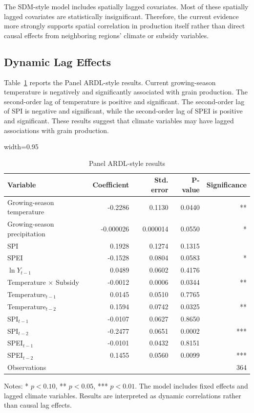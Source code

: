 \documentclass[12pt,a4paper]{article}
\begin{document}
The SDM-style model includes spatially lagged covariates. Most of these spatially lagged covariates are statistically insignificant. Therefore, the current evidence more strongly supports spatial correlation in production itself rather than direct causal effects from neighboring regions' climate or subsidy variables.

\subsection{Dynamic Lag Effects}

Table~\ref{tab:ardl} reports the Panel ARDL-style results. Current growing-season temperature is negatively and significantly associated with grain production. The second-order lag of temperature is positive and significant. The second-order lag of SPI is negative and significant, while the second-order lag of SPEI is positive and significant. These results suggest that climate variables may have lagged associations with grain production.

\begin{table}[H]
\centering
\caption{Panel ARDL-style results}
\label{tab:ardl}
\begin{threeparttable}
\begin{adjustbox}{width=0.95\textwidth}
\begin{tabular}{lrrrr}
\toprule
Variable & Coefficient & Std. error & P-value & Significance \\
\midrule
Growing-season temperature & -0.2286 & 0.1130 & 0.0440 & ** \\
Growing-season precipitation & -0.000026 & 0.000014 & 0.0550 & * \\
SPI & 0.1928 & 0.1274 & 0.1315 &  \\
SPEI & -0.1528 & 0.0804 & 0.0583 & * \\
\(\ln Y_{t-1}\) & 0.0489 & 0.0602 & 0.4176 &  \\
Temperature \(\times\) Subsidy & -0.0012 & 0.0006 & 0.0344 & ** \\
Temperature\(_{t-1}\) & 0.0145 & 0.0510 & 0.7765 &  \\
Temperature\(_{t-2}\) & 0.1594 & 0.0742 & 0.0325 & ** \\
SPI\(_{t-1}\) & -0.0107 & 0.0627 & 0.8650 &  \\
SPI\(_{t-2}\) & -0.2477 & 0.0651 & 0.0002 & *** \\
SPEI\(_{t-1}\) & -0.0101 & 0.0432 & 0.8151 &  \\
SPEI\(_{t-2}\) & 0.1455 & 0.0560 & 0.0099 & *** \\
\midrule
Observations & \multicolumn{4}{r}{364} \\
\bottomrule
\end{tabular}
\end{adjustbox}
\begin{tablenotes}
\small
\item Notes: * \(p<0.10\), ** \(p<0.05\), *** \(p<0.01\). The model includes fixed effects and lagged climate variables. Results are interpreted as dynamic correlations rather than causal lag effects.
\end{tablenotes}
\end{threeparttable}
\end{table}
\end{document}
